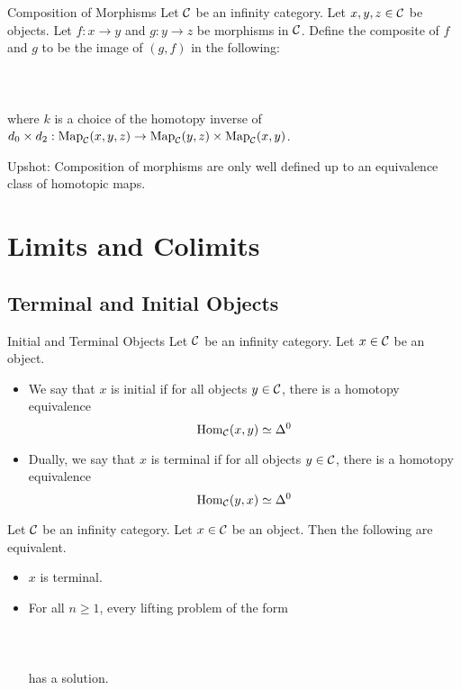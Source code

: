 \documentclass[a4paper]{article}
\begin{document}
\begin{defn}{Composition of Morphisms}{} Let $\mathcal{C}$ be an infinity category. Let $x,y,z\in\mathcal{C}$ be objects. Let $f:x\to y$ and $g:y\to z$ be morphisms in $\mathcal{C}$. Define the composite of $f$ and $g$ to be the image of $(g,f)$ in the following: \\~\\
\\~\\
where $k$ is a choice of the homotopy inverse of $d_0\times d_2:\text{Map}_{\mathcal{C}}(x,y,z)\to\text{Map}_{\mathcal{C}}(y,z)\times\text{Map}_{\mathcal{C}}(x,y)$. 
\end{defn}

Upshot: Composition of morphisms are only well defined up to an equivalence class of homotopic maps. 

\pagebreak
\section{Limits and Colimits}
\subsection{Terminal and Initial Objects}
\begin{defn}{Initial and Terminal Objects}{} Let $\mathcal{C}$ be an infinity category. Let $x\in\mathcal{C}$ be an object. 
\begin{itemize}
\item We say that $x$ is initial if for all objects $y\in\mathcal{C}$, there is a homotopy equivalence $$\operatorname{Hom}_{\mathcal{C}}(x,y)\simeq\Delta^0$$
\item Dually, we say that $x$ is terminal if for all objects $y\in\mathcal{C}$, there is a homotopy equivalence $$\operatorname{Hom}_{\mathcal{C}}(y,x)\simeq\Delta^0$$
\end{itemize}
\end{defn}

\begin{prp}{}{} Let $\mathcal{C}$ be an infinity category. Let $x\in\mathcal{C}$ be an object. Then the following are equivalent. 
\begin{itemize}
\item $x$ is terminal. 
\item For all $n\geq 1$, every lifting problem of the form \\~\\
\\~\\
has a solution. 
\end{itemize}
\end{prp}
\end{document}

